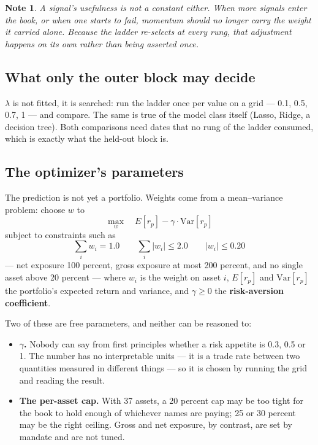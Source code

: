 \documentclass[11pt]{article}
\theoremstyle{runin}
\newtheorem*{note}{Note}
\begin{document}
\begin{note}
A signal's usefulness is not a constant either. When more signals enter the book, or when one
starts to fail, momentum should no longer carry the weight it carried alone. Because the ladder
re-selects at every rung, that adjustment happens on its own rather than being asserted once.
\end{note}

\subsection{What only the outer block may decide}

$\lambda$ is not fitted, it is searched: run the ladder once per value on a grid --- 0.1, 0.5,
0.7, 1 --- and compare. The same is true of the model class itself (Lasso, Ridge, a decision
tree). Both comparisons need dates that no rung of the ladder consumed, which is exactly what the
held-out block is.

\subsection{The optimizer's parameters}
\label{sec:optimizer}

The prediction is not yet a portfolio. Weights come from a mean--variance problem: choose $w$ to
\[
  \max_w \quad E[r_p] - \gamma \cdot \mathrm{Var}[r_p]
\]
subject to constraints such as
\[
  \sum_i w_i = 1.0 \qquad \sum_i \lvert w_i \rvert \leq 2.0 \qquad \lvert w_i \rvert \leq 0.20
\]
--- net exposure 100 percent, gross exposure at most 200 percent, and no single asset above 20
percent --- where $w_i$ is the weight on asset $i$, $E[r_p]$ and $\mathrm{Var}[r_p]$ the
portfolio's expected return and variance, and $\gamma \geq 0$ the \textbf{risk-aversion
coefficient}.

Two of these are free parameters, and neither can be reasoned to:

\begin{itemize}
  \item \textbf{$\gamma$.} Nobody can say from first principles whether a risk appetite is 0.3,
    0.5 or 1. The number has no interpretable units --- it is a trade rate between two quantities
    measured in different things --- so it is chosen by running the grid and reading the result.
  \item \textbf{The per-asset cap.} With 37 assets, a 20 percent cap may be too tight for the book
    to hold enough of whichever names are paying; 25 or 30 percent may be the right ceiling. Gross
    and net exposure, by contrast, are set by mandate and are not tuned.
\end{itemize}
\end{document}
